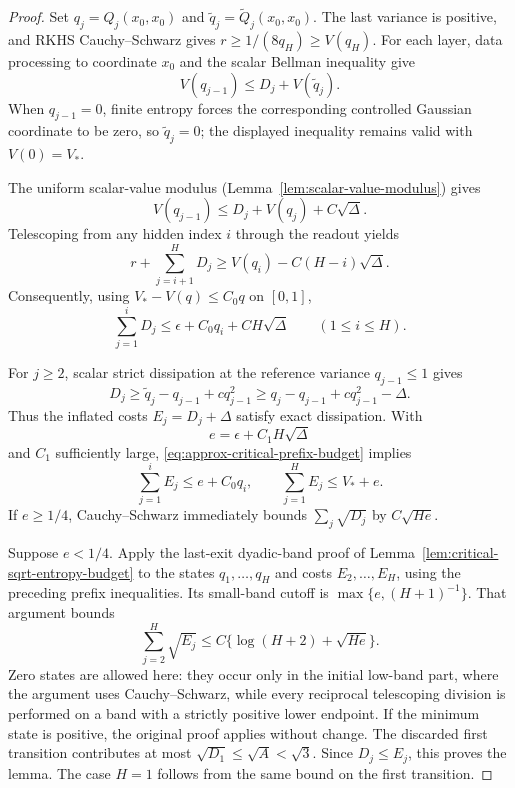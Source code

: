 \begin{proof}
Set $q_j=Q_j(x_0,x_0)$ and
$\widetilde q_j=\widetilde Q_j(x_0,x_0)$. The last variance is
positive, and RKHS Cauchy--Schwarz gives $r\ge1/(8q_H)\ge V(q_H)$.
For each layer, data processing to coordinate $x_0$ and the scalar
Bellman inequality give
\[
 V(q_{j-1})\le D_j+V(\widetilde q_j).
\]
When $q_{j-1}=0$, finite entropy forces the corresponding controlled
Gaussian coordinate to be zero, so $\widetilde q_j=0$; the displayed
inequality remains valid with $V(0)=V_*$.

The uniform scalar-value modulus
(Lemma~\ref{lem:scalar-value-modulus}) gives
\[
 V(q_{j-1})\le D_j+V(q_j)+C\sqrt\Delta.
\]
Telescoping from any hidden index $i$ through the readout yields
\[
 r+\sum_{j=i+1}^H D_j
       \ge V(q_i)-C(H-i)\sqrt\Delta.
\]
Consequently, using $V_*-V(q)\le C_0q$ on $[0,1]$,
\begin{equation}\label{eq:approx-critical-prefix-budget}
 \sum_{j=1}^iD_j
       \le\epsilon+C_0q_i+CH\sqrt\Delta
                         \qquad(1\le i\le H).
\end{equation}

For $j\ge2$, scalar strict dissipation at the reference variance
$q_{j-1}\le1$ gives
\[
 D_j\ge\widetilde q_j-q_{j-1}+cq_{j-1}^2
       \ge q_j-q_{j-1}+cq_{j-1}^2-\Delta.
\]
Thus the inflated costs $E_j=D_j+\Delta$ satisfy exact dissipation.
With
\[
 e=\epsilon+C_1H\sqrt\Delta
\]
and $C_1$ sufficiently large, \eqref{eq:approx-critical-prefix-budget}
implies
\[
 \sum_{j=1}^iE_j\le e+C_0q_i,\qquad
 \sum_{j=1}^H E_j\le V_*+e.
\]
If $e\ge1/4$, Cauchy--Schwarz immediately bounds
$\sum_j\sqrt{D_j}$ by $C\sqrt{He}$.

Suppose $e<1/4$. Apply the last-exit dyadic-band proof of
Lemma~\ref{lem:critical-sqrt-entropy-budget} to the states
$q_1,\ldots,q_H$ and costs $E_2,\ldots,E_H$, using the preceding
prefix inequalities. Its small-band cutoff is
$\max\{e,(H+1)^{-1}\}$. That argument bounds
\[
 \sum_{j=2}^H\sqrt{E_j}
        \le C\{\log(H+2)+\sqrt{He}\}.
\]
Zero states are allowed here: they occur only in the initial
low-band part, where the argument uses Cauchy--Schwarz, while every
reciprocal telescoping division is performed on a band with a
strictly positive lower endpoint. If the minimum state is positive,
the original proof applies without change. The discarded first
transition contributes at most $\sqrt{D_1}\le\sqrt A<\sqrt3$.
Since $D_j\le E_j$, this proves the lemma. The case $H=1$ follows
from the same bound on the first transition.
\end{proof}
